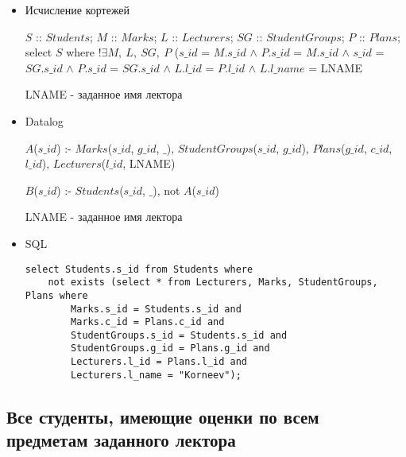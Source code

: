\documentclass[12pt,a4paper,oneside]{article}
\begin{document}
\begin{itemize}

\item Исчисление кортежей

$S$ :: $Students$; $M$ :: $Marks$; $L$ :: $Lecturers$; $SG$ :: $StudentGroups$; $P$ :: $Plans$; select $S$ where $! \exists M,\ L,\ SG,\ P$ ($s\_id$ = $M.s\_id$ $\wedge$ $P.s\_id$ = $M.s\_id$ $\wedge$ $s\_id$ = $SG.s\_id$ $\wedge$ $P.s\_id$ = $SG.s\_id$ $\wedge$ $L.l\_id$ = $P.l\_id$ $\wedge$ $L.l\_name$ = LNAME

LNAME - заданное имя лектора

\item Datalog

$A$($s\_id$) :- $Marks$($s\_id$, $g\_id$, $\_$), $StudentGroups$($s\_id$, $g\_id$), $Plans$($g\_id$, $c\_id$, $l\_id$), $Lecturers$($l\_id$, LNAME)

$B$($s\_id$) :- $Students$($s\_id$, $\_$), not $A$($s\_id$)

LNAME - заданное имя лектора

\item SQL

\begin{lstlisting}[label=task4,caption={Задание 4}]
select Students.s_id from Students where
    not exists (select * from Lecturers, Marks, StudentGroups, Plans where
        Marks.s_id = Students.s_id and
        Marks.c_id = Plans.c_id and
        StudentGroups.s_id = Students.s_id and
        StudentGroups.g_id = Plans.g_id and
        Lecturers.l_id = Plans.l_id and
        Lecturers.l_name = "Korneev");
\end{lstlisting}

\end{itemize}

\subsection{Все студенты, имеющие оценки по всем предметам заданного лектора}
\end{document}
